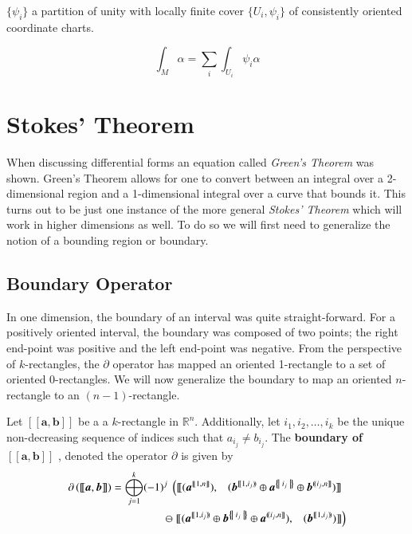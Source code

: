 $\{ \psi_i \}$ a partition of unity with locally finite cover $\{ U_i, \psi_i \}$ of consistently oriented coordinate charts.

\begin{equation}
\int_M \alpha = \sum_i \int_{U_i} \psi_i \alpha
\end{equation}


%
%
\section{Stokes' Theorem}

When discussing differential forms an equation called \emph{Green's Theorem} was shown. 
Green's Theorem allows for one to convert between an integral over a 2-dimensional region and a 1-dimensional integral
over a curve that bounds it.
This turns out to be just one instance of the more general \emph{Stokes' Theorem} 
which will work in higher dimensions as well.
To do so we will first need to generalize the notion of a bounding region or boundary.



\subsection{Boundary Operator}


In one dimension, the boundary of an interval was quite straight-forward.
For a positively oriented interval, the boundary was composed of two points; 
the right end-point was positive and the left end-point was negative.
From the perspective of $k$-rectangles, 
the $\partial$ operator has mapped an oriented 1-rectangle to a set of oriented 0-rectangles.
We will now generalize the boundary to map an oriented $n$-rectangle to an $(n-1)$-rectangle.


\begin{definition}
	Let  $[\![\boldsymbol{a}, \boldsymbol{b}]\!]$ be a a $k$-rectangle in $\mathbb{R}^n$.
	Additionally, let $i_1, i_2, \ldots, i_k$ be the unique non-decreasing sequence of indices such that $a_{i_j} \neq b_{i_j}$.
	The \textbf{boundary of $ \boldsymbol{[\![ a,b ]\!]} $ }, denoted the operator $\partial$ is given by
	\begin{align}
		\partial \left( [\![ \boldsymbol{a}, \boldsymbol{b} ]\!] \right) 
		= \bigoplus_{j=1}^k (-1)^j \;
			\left(	
				[\![ 	(\boldsymbol{a}^{[\![1,n]\!]}), 
					\;\;\;
					(\boldsymbol{b}^{[\![1,i_j)\!)} 
						\oplus \boldsymbol{a}^{\hset{i_j}}
						\oplus \boldsymbol{b}^{(\!(i_j,n]\!]}) 
				]\!] \right.\;
			\notag\\
			\ominus \left.
				[\![ 	(\boldsymbol{a}^{[\![1,i_j)\!)}
						\oplus \boldsymbol{b}^{\hset{i_j}}
						\oplus \boldsymbol{a}^{(\!(i_j, n]\!]}), 
					\;\;\;		 
					(\boldsymbol{b}^{[\![1,i_j)\!)}) 			
				]\!]
			\right)
	\end{align}
\end{definition}


